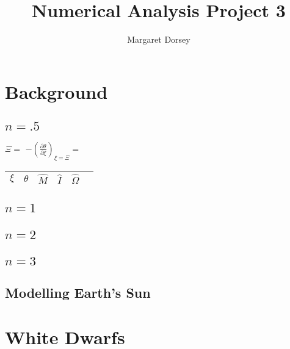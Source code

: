 \documentclass[11pt]{article} %
\title{Numerical Analysis Project 3}
\author{Margaret Dorsey}
\newcommand{\pder}[2][]{\frac{\partial#1}{\partial#2}}
\begin{document}
\maketitle

\section*{Background}
\subsection*{$n = .5$}

$\Xi = $
$-\left(\pder[\theta]{\xi}\right)_{\xi = \Xi} = $

\begin{tabular}{| c | c c c c c |}
\hline
$\xi$ & $\theta$ & $\hat{M}$ &  $\hat{I}$  & $\hat{\Omega}$ \\
\hline

\hline
\end{tabular}

\subsection*{$n = 1$}


\subsection*{$n = 2$}


\subsection*{$n = 3$}


\subsection*{Modelling Earth's Sun}

\section{White Dwarfs}
\end{document}
